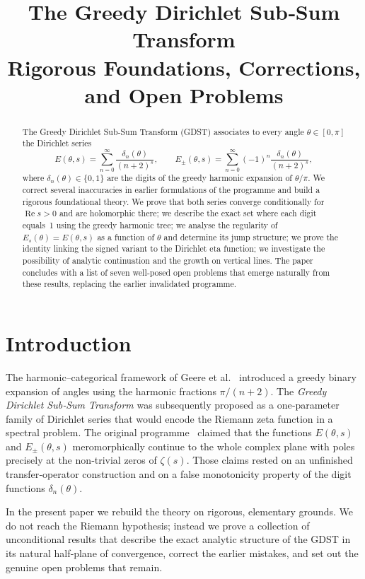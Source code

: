 \documentclass[11pt,a4paper]{article}
\title{\bfseries The Greedy Dirichlet Sub‑Sum Transform\\
\large Rigorous Foundations, Corrections, and Open Problems}
\author{}
\date{}
\theoremstyle{definition}
\theoremstyle{remark}
\begin{document}
\maketitle

\begin{abstract}
The Greedy Dirichlet Sub‑Sum Transform (GDST) associates to every angle \(\theta\in[0,\pi]\) the Dirichlet series
\[
E(\theta,s)=\sum_{n=0}^{\infty}\frac{\delta_n(\theta)}{(n+2)^s},\qquad 
E_{\pm}(\theta,s)=\sum_{n=0}^{\infty}(-1)^n\frac{\delta_n(\theta)}{(n+2)^s},
\]
where \(\delta_n(\theta)\in\{0,1\}\) are the digits of the greedy harmonic expansion of \(\theta/\pi\).
We correct several inaccuracies in earlier formulations of the programme and build a rigorous foundational theory.
We prove that both series converge conditionally for \(\operatorname{Re}s>0\) and are holomorphic there; we describe the exact set where each digit equals~1 using the greedy harmonic tree; we analyse the regularity of \(E_s(\theta)=E(\theta,s)\) as a function of \(\theta\) and determine its jump structure; we prove the identity linking the signed variant to the Dirichlet eta function; we investigate the possibility of analytic continuation and the growth on vertical lines.
The paper concludes with a list of seven well‑posed open problems that emerge naturally from these results, replacing the earlier invalidated programme.
\end{abstract}

\section{Introduction}
The harmonic–categorical framework of Geere et al.\ \cite{Geere2026a,Geere2026b} introduced a greedy binary expansion of angles using the harmonic fractions \(\pi/(n+2)\).
The \emph{Greedy Dirichlet Sub‑Sum Transform} was subsequently proposed as a one‑parameter family of Dirichlet series that would encode the Riemann zeta function in a spectral problem.
The original programme~\cite{HSTprogramme} claimed that the functions \(E(\theta,s)\) and \(E_{\pm}(\theta,s)\) meromorphically continue to the whole complex plane with poles precisely at the non‑trivial zeros of \(\zeta(s)\).
Those claims rested on an unfinished transfer‑operator construction and on a false monotonicity property of the digit functions \(\delta_n(\theta)\).

In the present paper we rebuild the theory on rigorous, elementary grounds.
We do not reach the Riemann hypothesis; instead we prove a collection of unconditional results that describe the exact analytic structure of the GDST in its natural half‑plane of convergence, correct the earlier mistakes, and set out the genuine open problems that remain.
\end{document}
